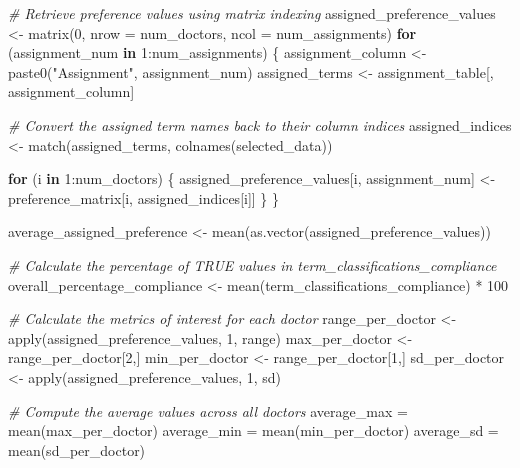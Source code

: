 \documentclass[
]{article}
\newenvironment{Shaded}{\begin{snugshade}}{\end{snugshade}}
\newcommand{\AttributeTok}[1]{\textcolor[rgb]{0.77,0.63,0.00}{#1}}
\newcommand{\CommentTok}[1]{\textcolor[rgb]{0.56,0.35,0.01}{\textit{#1}}}
\newcommand{\ControlFlowTok}[1]{\textcolor[rgb]{0.13,0.29,0.53}{\textbf{#1}}}
\newcommand{\DecValTok}[1]{\textcolor[rgb]{0.00,0.00,0.81}{#1}}
\newcommand{\FunctionTok}[1]{\textcolor[rgb]{0.00,0.00,0.00}{#1}}
\newcommand{\NormalTok}[1]{#1}
\newcommand{\OtherTok}[1]{\textcolor[rgb]{0.56,0.35,0.01}{#1}}
\newcommand{\SpecialCharTok}[1]{\textcolor[rgb]{0.00,0.00,0.00}{#1}}
\newcommand{\StringTok}[1]{\textcolor[rgb]{0.31,0.60,0.02}{#1}}
\begin{document}
\begin{Shaded}
\begin{Highlighting}[]
\CommentTok{\# Retrieve preference values using matrix indexing}
\NormalTok{assigned\_preference\_values }\OtherTok{\textless{}{-}} \FunctionTok{matrix}\NormalTok{(}\DecValTok{0}\NormalTok{, }\AttributeTok{nrow =}\NormalTok{ num\_doctors, }\AttributeTok{ncol =}\NormalTok{ num\_assignments)}
\ControlFlowTok{for}\NormalTok{ (assignment\_num }\ControlFlowTok{in} \DecValTok{1}\SpecialCharTok{:}\NormalTok{num\_assignments) \{}
\NormalTok{  assignment\_column }\OtherTok{\textless{}{-}} \FunctionTok{paste0}\NormalTok{(}\StringTok{"Assignment"}\NormalTok{, assignment\_num)}
\NormalTok{  assigned\_terms }\OtherTok{\textless{}{-}}\NormalTok{ assignment\_table[, assignment\_column]}
  
  \CommentTok{\# Convert the assigned term names back to their column indices}
\NormalTok{  assigned\_indices }\OtherTok{\textless{}{-}} \FunctionTok{match}\NormalTok{(assigned\_terms, }\FunctionTok{colnames}\NormalTok{(selected\_data))}
  
  \ControlFlowTok{for}\NormalTok{ (i }\ControlFlowTok{in} \DecValTok{1}\SpecialCharTok{:}\NormalTok{num\_doctors) \{}
\NormalTok{    assigned\_preference\_values[i, assignment\_num] }\OtherTok{\textless{}{-}}\NormalTok{ preference\_matrix[i, assigned\_indices[i]]}
\NormalTok{  \}}
\NormalTok{\}}

\NormalTok{average\_assigned\_preference }\OtherTok{\textless{}{-}} \FunctionTok{mean}\NormalTok{(}\FunctionTok{as.vector}\NormalTok{(assigned\_preference\_values))}

\CommentTok{\# Calculate the percentage of TRUE values in term\_classifications\_compliance}
\NormalTok{overall\_percentage\_compliance }\OtherTok{\textless{}{-}} \FunctionTok{mean}\NormalTok{(term\_classifications\_compliance) }\SpecialCharTok{*} \DecValTok{100}

\CommentTok{\# Calculate the metrics of interest for each doctor}
\NormalTok{range\_per\_doctor }\OtherTok{\textless{}{-}} \FunctionTok{apply}\NormalTok{(assigned\_preference\_values, }\DecValTok{1}\NormalTok{, range)}
\NormalTok{max\_per\_doctor }\OtherTok{\textless{}{-}}\NormalTok{ range\_per\_doctor[}\DecValTok{2}\NormalTok{,]}
\NormalTok{min\_per\_doctor }\OtherTok{\textless{}{-}}\NormalTok{ range\_per\_doctor[}\DecValTok{1}\NormalTok{,]}
\NormalTok{sd\_per\_doctor }\OtherTok{\textless{}{-}} \FunctionTok{apply}\NormalTok{(assigned\_preference\_values, }\DecValTok{1}\NormalTok{, sd)}

\CommentTok{\# Compute the average values across all doctors}
\NormalTok{average\_max }\OtherTok{=} \FunctionTok{mean}\NormalTok{(max\_per\_doctor)}
\NormalTok{average\_min }\OtherTok{=} \FunctionTok{mean}\NormalTok{(min\_per\_doctor)}
\NormalTok{average\_sd }\OtherTok{=} \FunctionTok{mean}\NormalTok{(sd\_per\_doctor)}


\end{Highlighting}
\end{Shaded}
\end{document}
